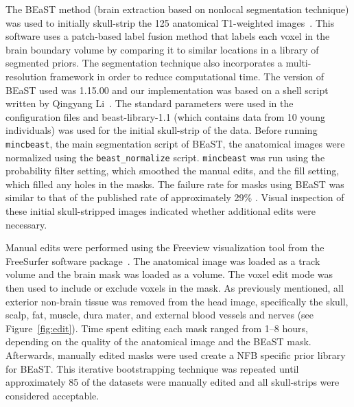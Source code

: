 \par The BEaST method (brain extraction based on nonlocal segmentation technique) was used to initially skull-strip the 125 anatomical T1-weighted images~\cite{Eskildsen2012}. This software uses a patch-based label fusion method that labels each voxel in the brain boundary volume by comparing it to similar locations in a library of segmented priors. The segmentation technique also incorporates a multi-resolution framework in order to reduce computational time. The version of BEaST used was 1.15.00 and our implementation was based on a shell script written by Qingyang Li~\cite{rpubs}. The standard parameters were used in the configuration files and beast-library-1.1 (which contains data from 10 young individuals) was used for the initial skull-strip of the data. Before running {\tt mincbeast}, the main segmentation script of BEaST, the anatomical images were normalized using the {\tt beast\_normalize} script. {\tt mincbeast} was run using the probability filter setting, which smoothed the manual edits, and the fill setting, which filled any holes in the masks. The failure rate for masks using BEaST was similar to that of the published rate of approximately 29\% \cite{Eskildsen2012}. Visual inspection of these initial skull-stripped images indicated whether additional edits were necessary.

\par Manual edits were performed using the Freeview visualization tool from the FreeSurfer software package~\cite{Fischl2012}. The anatomical image was loaded as a track volume and the brain mask was loaded as a volume. The voxel edit mode was then used to include or exclude voxels in the mask. As previously mentioned, all exterior non-brain tissue was removed from the head image, specifically the skull, scalp, fat, muscle, dura mater, and external blood vessels and nerves (see Figure~\ref{fig:edit}). Time spent editing each mask ranged from 1--8 hours, depending on the quality of the anatomical image and the BEaST mask. Afterwards, manually edited masks were used create a NFB specific prior library for BEaST. This iterative bootstrapping technique was repeated until approximately 85 of the datasets were manually edited and all skull-strips were considered acceptable.

